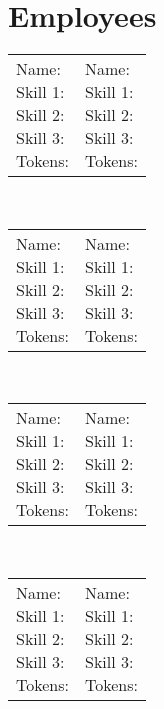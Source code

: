 \documentclass[11pt,a4paper]{article}
\begin{document}
\section*{Employees \hrulefill}

\begin{table}[!h]
    \large
    \begin{tabular}{|p{}|p{}}
        \makecell[l]{Name: \\ Skill 1: \\ Skill 2: \\ Skill 3: \\ Tokens:} & \makecell[l]{Name: \\ Skill 1: \\ Skill 2: \\ Skill 3: \\ Tokens:}
    \end{tabular} \\[\bigskipamount]
    \begin{tabular}{|p{}|p{}}
        \makecell[l]{Name: \\ Skill 1: \\ Skill 2: \\ Skill 3: \\ Tokens:} & \makecell[l]{Name: \\ Skill 1: \\ Skill 2: \\ Skill 3: \\ Tokens:}
    \end{tabular} \\[\bigskipamount]
    \begin{tabular}{|p{}|p{}}
        \makecell[l]{Name: \\ Skill 1: \\ Skill 2: \\ Skill 3: \\ Tokens:} & \makecell[l]{Name: \\ Skill 1: \\ Skill 2: \\ Skill 3: \\ Tokens:}
    \end{tabular} \\[\bigskipamount]
    \begin{tabular}{|p{}|p{}}
        \makecell[l]{Name: \\ Skill 1: \\ Skill 2: \\ Skill 3: \\ Tokens:} & \makecell[l]{Name: \\ Skill 1: \\ Skill 2: \\ Skill 3: \\ Tokens:}
    \end{tabular}
\end{table}
\end{document}
